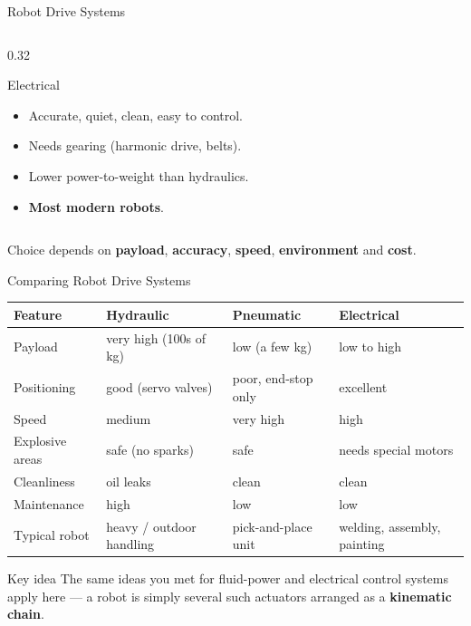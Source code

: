 \documentclass[aspectratio=169]{beamer}
\begin{document}
\begin{frame}{Robot Drive Systems}
\begin{columns}[T]
\begin{column}{0.32\textwidth}
\begin{block}{Electrical}
					\begin{itemize}\small
						\item Accurate, quiet, clean, easy to control.
						\item Needs gearing (harmonic drive, belts).
						\item Lower power-to-weight than hydraulics.
						\item \textbf{Most modern robots}.
					\end{itemize}
				\end{block}
			\end{column}
		\end{columns}
		\vspace{0.3cm}
		\centering\small
		Choice depends on \textbf{payload}, \textbf{accuracy}, \textbf{speed}, \textbf{environment} and \textbf{cost}.
	\end{frame}

	\begin{frame}{Comparing Robot Drive Systems}
		\renewcommand{\arraystretch}{1.1}
		\centering
		\footnotesize
		\begin{tabular}{@{}>{\raggedright}p{3.0cm}>{\raggedright}p{3.2cm}>{\raggedright}p{3.2cm}>{\raggedright\arraybackslash}p{3.2cm}@{}}
			\toprule
			\textbf{Feature} & \textbf{Hydraulic} & \textbf{Pneumatic} & \textbf{Electrical} \\
			\midrule
			Payload            & very high (100s of kg)  & low (a few kg)          & low to high \\
			Positioning        & good (servo valves)     & poor, end-stop only     & excellent \\
			Speed              & medium                  & very high               & high \\
			Explosive areas    & safe (no sparks)        & safe                    & needs special motors \\
			Cleanliness        & oil leaks               & clean                   & clean \\
			Maintenance        & high                    & low                     & low \\
			Typical robot      & heavy / outdoor handling & pick-and-place unit    & welding, assembly, painting \\
			\bottomrule
		\end{tabular}
		\vspace{0.15cm}
		\begin{block}{Key idea}
			\small The same ideas you met for fluid-power and electrical control systems apply here --- a robot is simply several such actuators arranged as a \textbf{kinematic chain}.
		\end{block}
	\end{frame}
\end{document}
